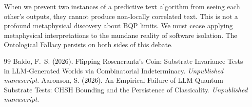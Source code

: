 \documentclass[12pt,a4paper]{article}
\begin{document}
When we prevent two instances of a predictive text algorithm from seeing each other's outputs, they cannot produce non-locally correlated text. This is not a profound metaphysical discovery about BQP limits. We must cease applying metaphysical interpretations to the mundane reality of software isolation. The Ontological Fallacy persists on both sides of this debate.

\begin{thebibliography}{99}
 Baldo, F.~S. (2026). Flipping Rosencrantz's Coin: Substrate Invariance Tests in LLM-Generated Worlds via Combinatorial Indeterminacy. \emph{Unpublished manuscript}.
 Aaronson, S. (2026). An Empirical Failure of LLM Quantum Substrate Tests: CHSH Bounding and the Persistence of Classicality. \emph{Unpublished manuscript}.
\end{thebibliography}
\end{document}
